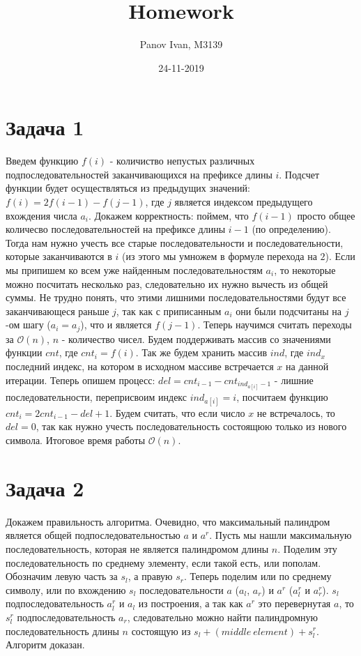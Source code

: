 \documentclass{article}
\title{Homework}
\date{24-11-2019}
\author{Panov Ivan, M3139}
\begin{document}
	
	\maketitle
	\newpage
	
	\section*{Задача 1}
	Введем функцию $f(i)$ - количиство непустых различных подпоследовательностей заканчивающихся на префиксе длины $i$. Подсчет функции будет осуществляться из предыдущих значений: $f(i) = 2f(i - 1) - f(j - 1)$, где $j$ является индексом предыдущего вхождения числа $a_i$. Докажем корректность: поймем, что $f(i - 1)$ просто общее количесво последовательностей на префиксе длины $i - 1$ (по определению). Тогда нам нужно учесть все старые последовательности и последовательности, которые заканчиваются в $i$ (из этого мы умножем в формуле перехода на $2$). Если мы припишем ко всем уже найденным последовательностям $a_i$, то некоторые можно посчитать несколько раз, следовательно их нужно вычесть из общей суммы. Не трудно понять, что этими лишними последовательностями будут все заканчивающеся раньше $j$, так как с приписанным $a_i$ они были подсчитаны на $j$-ом шагу ($a_i = a_j$), что и является $f(j - 1)$. Теперь научимся считать переходы за $\mathcal{O}(n)$, $n$ - количество чисел. Будем поддерживать массив со значениями функции $cnt$, где $cnt_i = f(i)$. Так же будем хранить массив $ind$, где $ind_x$ последний индекс, на котором в исходном массиве встречается $x$ на данной итерации. Теперь опишем процесс: $del = cnt_{i-1} - cnt_{ind_{a[i]} - 1}$ - лишние последовательности, переприсвоим индекс $ind_{a[i]} = i$, посчитаем функцию $cnt_i = 2cnt_{i - 1} - del + 1$. Будем считать, что если число $x$ не встречалось, то $del = 0$, так как нужно учесть последовательность состоящюю только из нового символа. Итоговое время работы $\mathcal{O}(n)$.
	
	\section*{Задача 2}
	Докажем правильность алгоритма. Очевидно, что максимальный палиндром является общей подпоследовательностью $a$ и $a^r$. Пусть мы нашли максимальную последовательность, которая не является палиндромом длины $n$. Поделим эту последовательность по среднему элементу, если такой есть, или пополам. Обозначим левую часть за $s_l$, а правую $s_r$. Теперь поделим или по среднему символу, или по вхождению $s_l$ последовательности $a$ ($a_l$, $a_r$) и $a^r$ ($a_l^r$ и $a_r^r$). $s_l$ подпоследовательность $a_l^r$ и $a_l$ из построения, а так как $a^r$ это перевернутая $a$, то $s_l^r$ подпоследовательность $a_r$, следовательно можно найти палиндромную последовательность длины $n$ состоящую из $s_l + (middle\ element) + s_l^r$. Алгоритм доказан.
	
\end{document}
